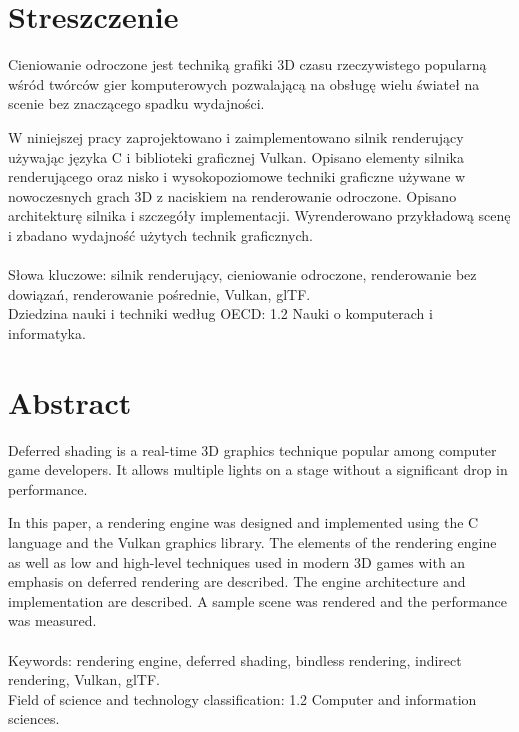 \chapter*{Streszczenie}
Cieniowanie odroczone jest techniką grafiki 3D czasu rzeczywistego popularną wśród twórców gier komputerowych pozwalającą na obsługę wielu świateł na scenie bez znaczącego spadku wydajności.

W niniejszej pracy zaprojektowano i zaimplementowano silnik renderujący używając języka C i biblioteki graficznej Vulkan.
Opisano elementy silnika renderującego oraz nisko i wysokopoziomowe techniki graficzne używane w nowoczesnych grach 3D z naciskiem na renderowanie odroczone. Opisano architekturę silnika i szczegóły implementacji. Wyrenderowano przykładową scenę i zbadano wydajność użytych technik graficznych.
\\
\\
Słowa kluczowe: silnik renderujący, cieniowanie odroczone, renderowanie bez dowiązań, renderowanie pośrednie, Vulkan, glTF.
\\
Dziedzina nauki i techniki według OECD: 1.2 Nauki o komputerach i informatyka.

\chapter*{Abstract}

Deferred shading is a real-time 3D graphics technique popular among computer game developers. It allows multiple lights on a stage without a significant drop in performance.

In this paper, a rendering engine was designed and implemented using the C language and the Vulkan graphics library.
The elements of the rendering engine as well as low and high-level techniques used in modern 3D games with an emphasis on deferred rendering are described.
The engine architecture and implementation are described.
A sample scene was rendered and the performance was measured.
\\
\\
Keywords: rendering engine, deferred shading, bindless rendering, indirect rendering, Vulkan, glTF.
\\
Field of science and technology classification: 1.2 Computer and information sciences.